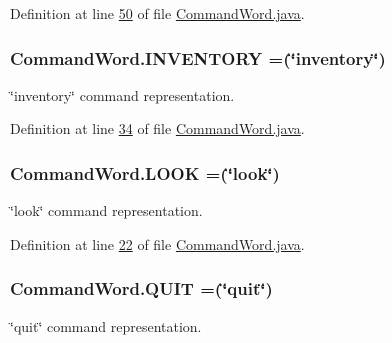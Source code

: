 Definition at line \hyperlink{CommandWord_8java_source_l00050}{50} of file \hyperlink{CommandWord_8java_source}{Command\-Word.\-java}.

\hypertarget{enumCommandWord_a624e48d45c9a1c4f614c62faa553c855}{
\subsubsection[{I\-N\-V\-E\-N\-T\-O\-R\-Y}]{\setlength{\rightskip}{0pt plus 5cm}Command\-Word.\-I\-N\-V\-E\-N\-T\-O\-R\-Y =(\char`\"{}inventory\char`\"{})}}\label{enumCommandWord_a624e48d45c9a1c4f614c62faa553c855}


\char`\"{}inventory\char`\"{} command representation. 



Definition at line \hyperlink{CommandWord_8java_source_l00034}{34} of file \hyperlink{CommandWord_8java_source}{Command\-Word.\-java}.

\hypertarget{enumCommandWord_ae56e5a1529f673fe19373fed2717cd8c}{
\subsubsection[{L\-O\-O\-K}]{\setlength{\rightskip}{0pt plus 5cm}Command\-Word.\-L\-O\-O\-K =(\char`\"{}look\char`\"{})}}\label{enumCommandWord_ae56e5a1529f673fe19373fed2717cd8c}


\char`\"{}look\char`\"{} command representation. 



Definition at line \hyperlink{CommandWord_8java_source_l00022}{22} of file \hyperlink{CommandWord_8java_source}{Command\-Word.\-java}.

\hypertarget{enumCommandWord_aa606b7593e9ff8c395e091a0f726e348}{
\subsubsection[{Q\-U\-I\-T}]{\setlength{\rightskip}{0pt plus 5cm}Command\-Word.\-Q\-U\-I\-T =(\char`\"{}quit\char`\"{})}}\label{enumCommandWord_aa606b7593e9ff8c395e091a0f726e348}


\char`\"{}quit\char`\"{} command representation. 



